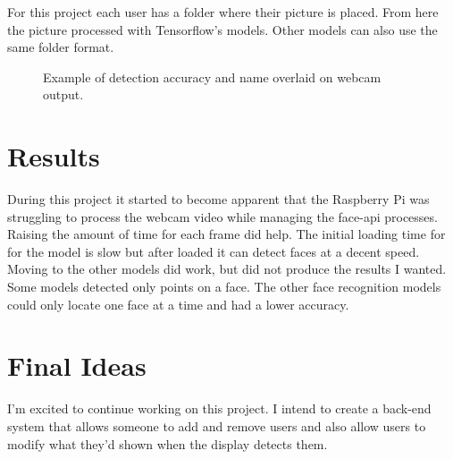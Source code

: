 \documentclass[10pt,twocolumn,letterpaper]{article}
\begin{document}
For this project each user has a folder where their picture is placed.  From here the picture processed with Tensorflow's models.  Other models can also use the same folder format.
\begin{figure}
\begin{center}
\end{center}
   \caption{Example of detection accuracy and name overlaid on webcam output.}
\label{fig:long}
\label{fig:onecol}
\end{figure}

\section{Results}

During this project it started to become apparent that the Raspberry Pi was struggling to process the webcam video while managing the face-api processes.  Raising the amount of time for each frame did help.  The initial loading time for for the model is slow but after loaded it can detect faces at a decent speed.  Moving to the other models did work, but did not produce the results I wanted.  Some models detected only points on a face.  The other face recognition models could only locate one face at a time and had a lower accuracy.




\section{Final Ideas}

I'm excited to continue working on this project.  I intend to create a back-end system that allows someone to add and remove users and also allow users to modify what they'd shown when the display detects them. 




{\small


}
\end{document}

